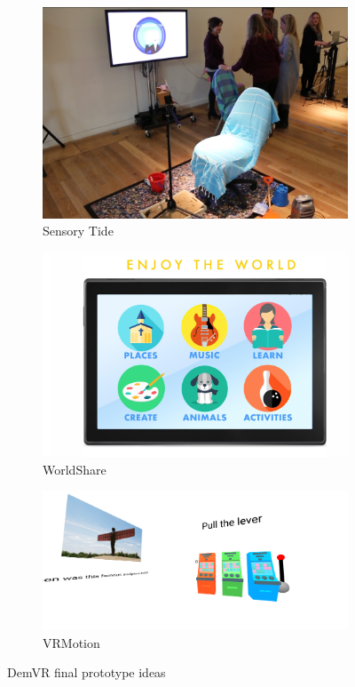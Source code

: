\begin{figure}[htbp]
\begin{subfigure}[t]{0.3\textwidth}
    \includegraphics[width=\linewidth]{Images/DemVR/SensoryTides.png}
\caption{Sensory Tide}
\label{fig:SensoryTide}
\end{subfigure}\hfill
\begin{subfigure}[t]{0.3\textwidth}
    \includegraphics[width=\linewidth]{Images/DemVR/WorldShare.png}
\caption{WorldShare}
\label{fig:WorldShare}
\end{subfigure}\hfill
\begin{subfigure}[t]{0.3\textwidth}
    \includegraphics[width=\linewidth]{Images/DemVR/VRMotion.png}
\caption{VRMotion}
\label{fig:VRMotion}
\end{subfigure}
\caption{DemVR final prototype ideas}
\label{fig:DemVRFinalIdeas}
\end{figure}
